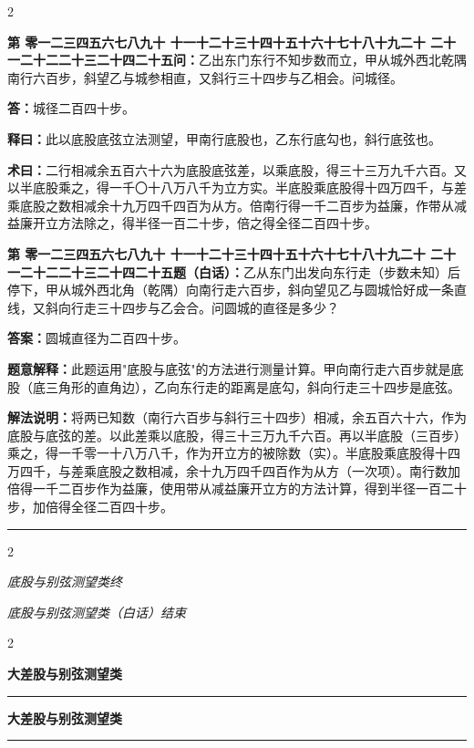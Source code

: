 \documentclass[10pt,a4paper]{article}
\newcommand{\longline}{\noindent\rule{\textwidth}{0.4pt}}
\newcounter{probnum}
\newcounter{probnumvol}[section]
\newcommand{\chnum}[1]{%
  \ifcase#1 零\or 一\or 二\or 三\or 四\or 五\or 六\or 七\or 八\or 九\or 十\or
    十一\or 十二\or 十三\or 十四\or 十五\or 十六\or 十七\or 十八\or 十九\or 二十\or
    二十一\or 二十二\or 二十三\or 二十四\or 二十五\fi}
\newcommand{\problemclassical}[1]{%
  \stepcounter{probnumvol}%
  \par\noindent
  \textcolor{classicalcolor}{\textbf{第\chnum{\value{probnumvol}}问：}}#1\par\smallskip
}
\newcommand{\problemmodern}[1]{%
  \par\noindent
  \textcolor{moderncolor}{\textbf{第\chnum{\value{probnumvol}}题（白话）：}}#1\par\smallskip
}
\newcommand{\answerclassical}[1]{%
  \par\noindent\textcolor{classicalcolor}{\textbf{答：}}#1\par
}
\newcommand{\answermodern}[1]{%
  \par\noindent\textcolor{moderncolor}{\textbf{答案：}}#1\par
}
\newcommand{\shiyiclassical}[1]{%
  \par\noindent\textcolor{classicalcolor}{\textbf{释曰：}}#1\par
}
\newcommand{\shiyimodern}[1]{%
  \par\noindent\textcolor{moderncolor}{\textbf{题意解释：}}#1\par
}
\newcommand{\shuyueclassical}[1]{%
  \par\noindent\textcolor{classicalcolor}{\textbf{术曰：}}#1\par
}
\newcommand{\shuyuemodern}[1]{%
  \par\noindent\textcolor{moderncolor}{\textbf{解法说明：}}#1\par
}
\newcommand{\volheaderclassical}[1]{%
  \begin{center}{\large\bfseries\color{volcolor} #1}\end{center}
  \vspace{0.3cm}
  \longline
  \vspace{0.3cm}
}
\newcommand{\volheadermodern}[1]{%
  \begin{center}{\large\bfseries\color{volcolor} #1}\end{center}
  \vspace{0.3cm}
  \longline
  \vspace{0.3cm}
}
\newcommand{\endclassical}[1]{%
  \vspace{0.3cm}
  \begin{center}\textit{#1}\end{center}
}
\newcommand{\endmodern}[1]{%
  \vspace{0.3cm}
  \begin{center}\textit{#1}\end{center}
}
\begin{document}
\begin{paracol}{2}

\problemclassical{乙出东门东行不知步数而立，甲从城外西北乾隅南行六百步，斜望乙与城参相直，又斜行三十四步与乙相会。问城径。}

\answerclassical{城径二百四十步。}

\shiyiclassical{此以底股底弦立法测望，甲南行底股也，乙东行底勾也，斜行底弦也。}

\shuyueclassical{二行相减余五百六十六为底股底弦差，以乘底股，得三十三万九千六百。又以半底股乘之，得一千〇十八万八千为立方实。半底股乘底股得十四万四千，与差乘底股之数相减余十九万四千四百为从方。倍南行得一千二百步为益廉，作带从减益廉开立方法除之，得半径一百二十步，倍之得全径二百四十步。}

\switchcolumn

\problemmodern{乙从东门出发向东行走（步数未知）后停下，甲从城外西北角（乾隅）向南行走六百步，斜向望见乙与圆城恰好成一条直线，又斜向行走三十四步与乙会合。问圆城的直径是多少？}

\answermodern{圆城直径为二百四十步。}

\shiyimodern{此题运用"底股与底弦"的方法进行测量计算。甲向南行走六百步就是底股（底三角形的直角边），乙向东行走的距离是底勾，斜向行走三十四步是底弦。}

\shuyuemodern{将两已知数（南行六百步与斜行三十四步）相减，余五百六十六，作为底股与底弦的差。以此差乘以底股，得三十三万九千六百。再以半底股（三百步）乘之，得一千零一十八万八千，作为开立方的被除数（实）。半底股乘底股得十四万四千，与差乘底股之数相减，余十九万四千四百作为从方（一次项）。南行数加倍得一千二百步作为益廉，使用带从减益廉开立方的方法计算，得到半径一百二十步，加倍得全径二百四十步。}

\end{paracol}

\vspace{0.5cm}
\longline
\begin{paracol}{2}
\endclassical{底股与别弦测望类终}
\switchcolumn
\endmodern{底股与别弦测望类（白话）结束}
\end{paracol}

\newpage

\setcounter{probnumvol}{0}

\begin{paracol}{2}

\volheaderclassical{大差股与别弦测望类}

\switchcolumn

\volheadermodern{大差股与别弦测望类}

\end{paracol}
\end{document}
